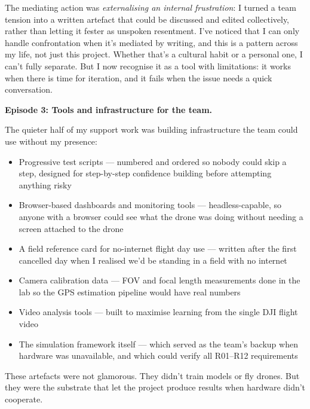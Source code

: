 The mediating action was \textit{externalising an internal frustration}: I turned a team tension into a written artefact that could be discussed and edited collectively, rather than letting it fester as unspoken resentment. I've noticed that I can only handle confrontation when it's mediated by writing, and this is a pattern across my life, not just this project. Whether that's a cultural habit or a personal one, I can't fully separate. But I now recognise it as a tool with limitations: it works when there is time for iteration, and it fails when the issue needs a quick conversation.

\textbf{Episode 3: Tools and infrastructure for the team.}

The quieter half of my support work was building infrastructure the team could use without my presence:

\begin{itemize}[nosep]
\item Progressive test scripts --- numbered and ordered so nobody could skip a step, designed for step-by-step confidence building before attempting anything risky
\item Browser-based dashboards and monitoring tools --- headless-capable, so anyone with a browser could see what the drone was doing without needing a screen attached to the drone
\item A field reference card for no-internet flight day use --- written after the first cancelled day when I realised we'd be standing in a field with no internet
\item Camera calibration data --- FOV and focal length measurements done in the lab so the GPS estimation pipeline would have real numbers
\item Video analysis tools --- built to maximise learning from the single DJI flight video
\item The simulation framework itself --- which served as the team's backup when hardware was unavailable, and which could verify all R01--R12 requirements
\end{itemize}

These artefacts were not glamorous. They didn't train models or fly drones. But they were the substrate that let the project produce results when hardware didn't cooperate.

